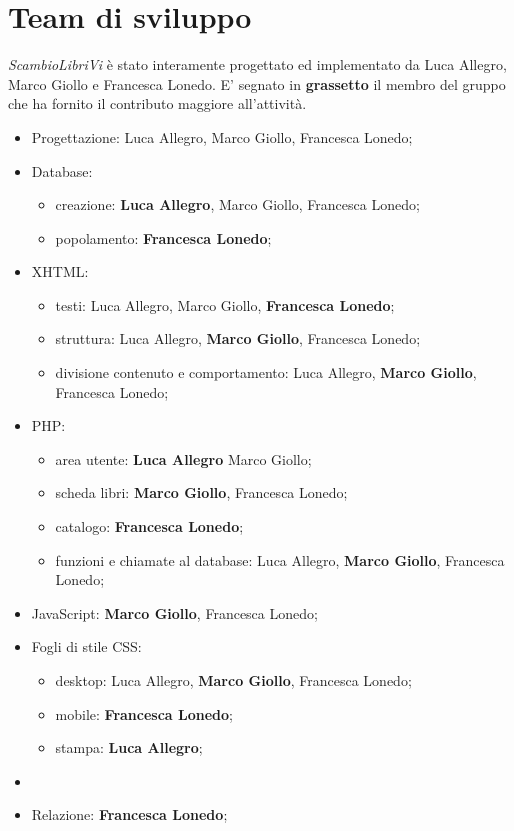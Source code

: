 \documentclass[openany,10pt,a4paper]{article}
\begin{document}
	\section{Team di sviluppo}
	\textit{ScambioLibriVi} è stato interamente progettato ed implementato da Luca Allegro, Marco Giollo e Francesca Lonedo. E' segnato in \textbf{grassetto} il membro del gruppo che ha fornito il contributo maggiore all'attività.
	\begin{itemize}
		\item Progettazione: Luca Allegro, Marco Giollo, Francesca Lonedo;
		\item Database: 
			\begin{itemize}
				\item creazione: \textbf{Luca Allegro}, Marco Giollo, Francesca Lonedo;
				\item popolamento: \textbf{Francesca Lonedo};
			\end{itemize}
		\item XHTML:
			\begin{itemize}
				\item testi: Luca Allegro, Marco Giollo, \textbf{Francesca Lonedo};
				\item struttura: Luca Allegro, \textbf{Marco Giollo}, Francesca Lonedo;
				\item divisione contenuto e comportamento: Luca Allegro, \textbf{Marco Giollo}, Francesca Lonedo;
			\end{itemize}
		\item PHP:
			\begin{itemize}
				\item area utente: \textbf{Luca Allegro} Marco Giollo;
				\item scheda libri: \textbf{Marco Giollo}, Francesca Lonedo;
				\item catalogo: \textbf{Francesca Lonedo};
				\item funzioni e chiamate al database: Luca Allegro, \textbf{Marco Giollo}, Francesca Lonedo;
			\end{itemize}
		\item JavaScript: \textbf{Marco Giollo}, Francesca Lonedo;
		\item Fogli di stile CSS:
			\begin{itemize}
				\item desktop: Luca Allegro, \textbf{Marco Giollo}, Francesca Lonedo;
				\item mobile: \textbf{Francesca Lonedo};
				\item stampa: \textbf{Luca Allegro};
			\end{itemize}
		\item
		\item Relazione: \textbf{Francesca Lonedo};
	\end{itemize}
\end{document}
